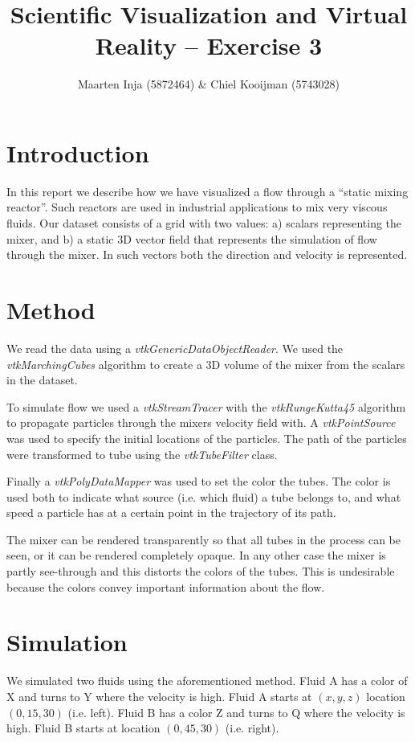 \documentclass{article}[10pt]
\title{Scientific Visualization and Virtual Reality – Exercise 3}
\author{Maarten Inja (5872464) \& Chiel Kooijman (5743028)}
\begin{document}
\maketitle

\section{Introduction}
In this report we describe how we have visualized a flow through a ``static
mixing reactor''. Such reactors are used in industrial applications to mix very
viscous fluids. Our dataset consists of a grid with two values: a) scalars
representing the mixer, and b) a static 3D vector field that represents the
simulation of flow through the mixer. In such vectors both the direction and
velocity is represented.

\section{Method}
We read the data using a \emph{vtkGenericDataObjectReader}. We used the
\emph{vtkMarchingCubes} algorithm to create a 3D volume of the mixer from the
scalars in the dataset.

To simulate flow we used a \emph{vtkStreamTracer} with the
\emph{vtkRungeKutta45} algorithm to propagate particles through the mixers
velocity field with. A \emph{vtkPointSource} was used to specify the initial
locations of the particles. The path of the particles were transformed to tube
using the \emph{vtkTubeFilter} class.

Finally a \emph{vtkPolyDataMapper} was used to set the color the tubes. The
color is used both to indicate what source (i.e. which fluid) a tube belongs to,
and what speed a particle has at a certain point in the trajectory of its path.

The mixer can be rendered transparently so that all tubes in the process can be seen,
or it can be rendered completely opaque. In any other case the mixer is partly
see-through and this distorts the colors of the tubes. This is undesirable
because the colors convey important information about the flow.

\section{Simulation}
We simulated two fluids using the aforementioned method. Fluid A has a color of
X and turns to Y where the velocity is high. Fluid A starts at $(x, y, z)$
location $(0, 15, 30)$ (i.e. left). Fluid B has a color Z and turns to Q where
the velocity is high. Fluid B starts at location $(0, 45, 30)$ (i.e. right).
\end{document}
